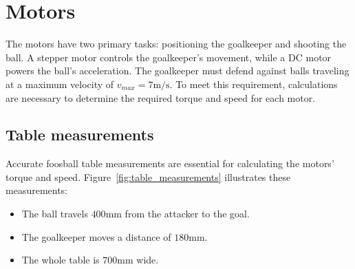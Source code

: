 \newpage
\section{Motors}\label{sec:motors}
The motors have two primary tasks: positioning the goalkeeper and shooting the ball.
A stepper motor controls the goalkeeper's movement, while a DC motor powers the ball's acceleration.
The goalkeeper must defend against balls traveling at a maximum velocity of $v_{max}=7\text{m/s}$.
To meet this requirement, calculations are necessary to determine the required torque and speed for each motor.

\subsection{Table measurements}\label{subsec:table_measurements}
Accurate foosball table measurements are essential for calculating the motors' torque and speed.
Figure~\ref{fig:table_measurements} illustrates these measurements:
\begin{itemize}
    \item The ball travels $400\text{mm}$ from the attacker to the goal.
    \item The goalkeeper moves a distance of $180\text{mm}$.
    \item The whole table is $700\text{mm}$ wide.
\end{itemize}

